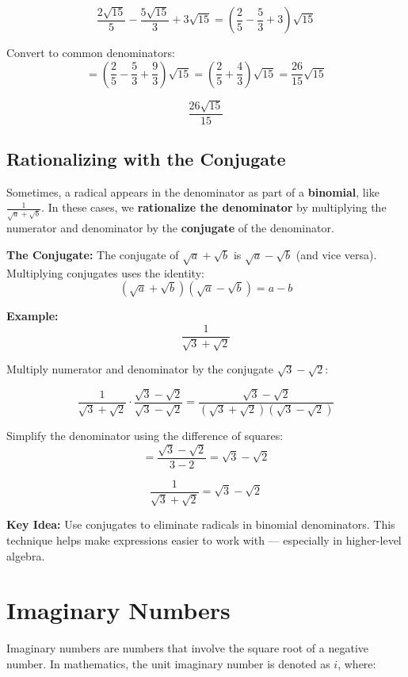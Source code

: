 \documentclass[11pt]{article}
\begin{document}
\[
\frac{2\sqrt{15}}{5} - \frac{5\sqrt{15}}{3} + 3\sqrt{15}
= \left( \frac{2}{5} - \frac{5}{3} + 3 \right)\sqrt{15}
\]

Convert to common denominators:
\[
= \left( \frac{2}{5} - \frac{5}{3} + \frac{9}{3} \right)\sqrt{15}
= \left( \frac{2}{5} + \frac{4}{3} \right)\sqrt{15}
= \frac{26}{15} \sqrt{15}
\]

\[
\boxed{\frac{26\sqrt{15}}{15}}
\]

\subsection{Rationalizing with the Conjugate}

Sometimes, a radical appears in the denominator as part of a \textbf{binomial}, like \( \frac{1}{\sqrt{a} + \sqrt{b}} \). In these cases, we \textbf{rationalize the denominator} by multiplying the numerator and denominator by the \textbf{conjugate} of the denominator.

\medskip
\textbf{The Conjugate:}
The conjugate of \( \sqrt{a} + \sqrt{b} \) is \( \sqrt{a} - \sqrt{b} \) (and vice versa).
Multiplying conjugates uses the identity:
\[
(\sqrt{a} + \sqrt{b})(\sqrt{a} - \sqrt{b}) = a - b
\]

\bigskip
\textbf{Example:}
\[
\frac{1}{\sqrt{3} + \sqrt{2}}
\]

Multiply numerator and denominator by the conjugate \( \sqrt{3} - \sqrt{2} \):

\[
\frac{1}{\sqrt{3} + \sqrt{2}} \cdot \frac{\sqrt{3} - \sqrt{2}}{\sqrt{3} - \sqrt{2}} = \frac{\sqrt{3} - \sqrt{2}}{(\sqrt{3} + \sqrt{2})(\sqrt{3} - \sqrt{2})}
\]

Simplify the denominator using the difference of squares:
\[
= \frac{\sqrt{3} - \sqrt{2}}{3 - 2} = \sqrt{3} - \sqrt{2}
\]

\[
\boxed{\frac{1}{\sqrt{3} + \sqrt{2}} = \sqrt{3} - \sqrt{2}}
\]

\bigskip
\textbf{Key Idea:}
Use conjugates to eliminate radicals in binomial denominators.
This technique helps make expressions easier to work with — especially in higher-level algebra.

\section{Imaginary Numbers}

Imaginary numbers are numbers that involve the square root of a negative number. In mathematics, the unit imaginary number is denoted as \( i \), where:
\end{document}
